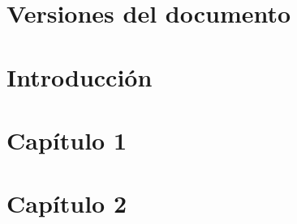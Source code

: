 \documentclass{article}
\author{%
	\textbf{Autor}\\    
    Daniel E. Hanke \\
    Trend Ingenieria \\
    \texttt{dehanke@proveedores.siderca.com}\vspace{20pt} \\
	\textbf{Supervisor}\\    
    Pablo Delfino \\
    GEIN / APRE \\
    \texttt{pdelfino@tenaris.com}
    }
\begin{document}


\tableofcontents

\newpage

\section{Versiones del documento}



\newpage



\section{Introducción}



\section{Capítulo 1}



\section{Capítulo 2}


\end{document}
